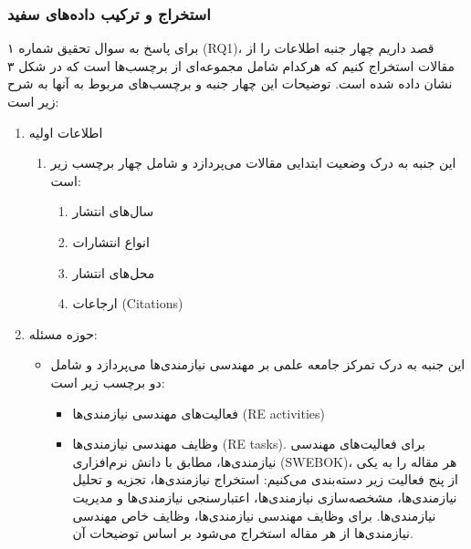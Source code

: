\documentclass[a4paper,10pt]{article}
\begin{document}
                \subsubsection{استخراج و ترکیب داده‌های سفید}

                    برای پاسخ به سوال تحقیق شماره ۱ (RQ1)، قصد داریم چهار جنبه اطلاعات را از مقالات استخراج کنیم که هرکدام شامل مجموعه‌ای از برچسب‌ها است که در شکل ۳ نشان داده شده است. توضیحات این چهار جنبه و برچسب‌های مربوط به آنها به شرح زیر است:

                    \begin{enumerate}
                        \item اطلاعات اولیه
                        \begin{enumerate}
                            \item این جنبه به درک وضعیت ابتدایی مقالات می‌پردازد و شامل چهار برچسب زیر است:
                            \begin{enumerate}
                                \item سال‌های انتشار
                                \item انواع انتشارات
                                \item محل‌های انتشار
                                \item ارجاعات (Citations)
                            \end{enumerate}
                        \end{enumerate}
                        
                        \item حوزه مسئله:
                        \begin{itemize}
                            \item این جنبه به درک تمرکز جامعه علمی بر مهندسی نیازمندی‌ها می‌پردازد و شامل دو برچسب زیر است:
                            \begin{itemize}
                                \item فعالیت‌های مهندسی نیازمندی‌ها (RE activities)
                                \item وظایف مهندسی نیازمندی‌ها (RE tasks). برای فعالیت‌های مهندسی نیازمندی‌ها، مطابق با دانش نرم‌افزاری (SWEBOK)، هر مقاله را به یکی از پنج فعالیت زیر دسته‌بندی می‌کنیم: استخراج نیازمندی‌ها، تجزیه و تحلیل نیازمندی‌ها، مشخصه‌سازی نیازمندی‌ها، اعتبارسنجی نیازمندی‌ها و مدیریت نیازمندی‌ها. برای وظایف مهندسی نیازمندی‌ها، وظایف خاص مهندسی نیازمندی‌ها از هر مقاله استخراج می‌شود بر اساس توضیحات آن.
                            \end{itemize}
                        \end{itemize}
                        

\end{enumerate}
\end{document}
